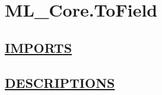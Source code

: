 \chapter*{ML\_Core.ToField}
\hypertarget{ecldoc:toc:ML_Core.ToField}{}

\section*{\underline{IMPORTS}}

\section*{\underline{DESCRIPTIONS}}
